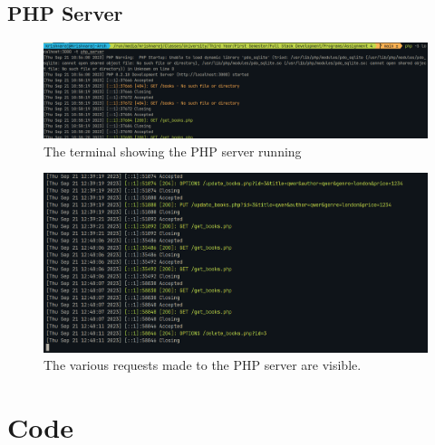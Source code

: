\documentclass[11pt]{article}
\begin{document}
\subsection{PHP Server}

\begin{figure}[H]
    \centering
    \includegraphics[width=.95\textwidth]{screenshots/php server 1.png}
    \caption{The terminal showing the PHP server running}
\end{figure}
\begin{figure}[H]
    \centering
    \includegraphics[width=.95\textwidth]{screenshots/php server 2.png}
    \caption{The various requests made to the PHP server are visible. }
\end{figure}

\section{Code}






\end{document}
